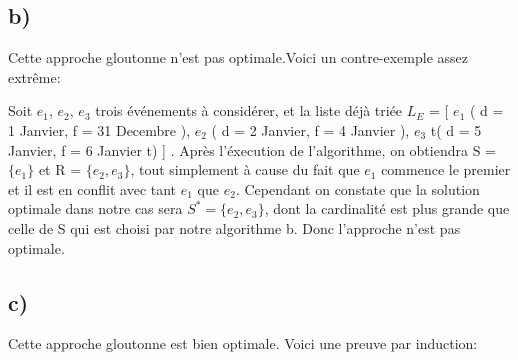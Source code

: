 \documentclass[10pt,a4paper]{article}
\begin{document}
\subsection{b)}
Cette approche gloutonne n'est pas optimale.Voici un contre-exemple assez extrême:

Soit $e_1$, $e_2$, $e_3$ trois événements à considérer, et la liste déjà triée $L_{E}$ = [ $e_1$  ( d = 1 Janvier, f = 31 Decembre ), $e_2$  ( d = 2 Janvier, f = 4 Janvier ), $e_3$  t( d = 5 Janvier, f = 6 Janvier t)    ] . Après l'éxecution de l'algorithme, on obtiendra S = $\{e_1\} $ et R = $\{e_2,e_3\} $, tout simplement à cause du fait que $e_1$ commence le premier et il est en conflit avec tant $e_1$ que $e_2$. Cependant on constate que la solution optimale dans notre cas sera $S^{*} = \{e_2,e_3\} $, dont la cardinalité est plus grande que celle de S qui est choisi par notre algorithme b. Donc l'approche n'est pas optimale.
\newline

\subsection{c)}
Cette approche gloutonne est bien optimale. Voici une preuve par induction:
\end{document}
